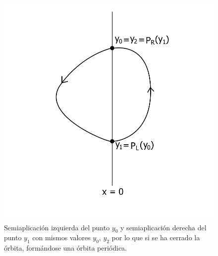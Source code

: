 \documentclass[12pt,a4paper]{report} %
\begin{document}
	\begin{figure}[h]
		\centering
 		\includegraphics[width=1.1\textwidth,center]{aplipoincareLRcerrado.jpg}
		\caption{Semiaplicación izquierda del punto $y_0$ y semiaplicación derecha del punto $y_1$ con mismos valores $y_0$, $y_2$ por lo que si se ha cerrado la órbita, formándose una órbita periódica.}
		\label{fig:aplipoincareLRcerrado}
	\end{figure}\smallskip
	
	\newpage
	
\end{document}
